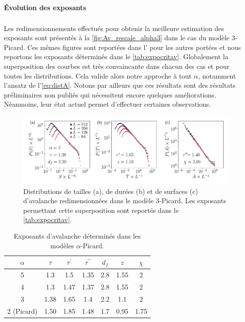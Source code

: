 \paragraph{\'Evolution des exposants}

\subparagraph{}Les redimensionnements effectués pour obtenir la meilleure estimation des exposants sont présentés à la \autoref{fig:Av_rescale_alpha3} dans le cas du modèle 3-Picard. Ces mêmes figures sont reportées dans l' pour les autres portées et nous reportons les exposants déterminés dans le \autoref{tab:expocritav}. Globalement la superposition des courbes est très convaincante dans chacun des cas et pour toutes les distributions. Cela valide alors notre approche à tout $\alpha$, notamment l'ansatz de l'\autoref{eq:distA}. Notons par ailleurs que ces résultats sont des résultats préliminaires non publiés qui nécessitent encore quelques améliorations. Néanmoins, leur état actuel permet d'effectuer certaines observations.

\begin{figure}[h]
	\centering
	\includegraphics[width=\textwidth]{Chapitre4/Figures/Avalanches/Rescale_Av_alpha3.pdf}
	\caption{Distributions de tailles (a), de durées (b) et de surfaces (c) d'avalanche redimensionnées dans le modèle 3-Picard. Les exposants permettant cette superposition sont reportés dans le \autoref{tab:expocritav}.}
	\label{fig:Av_rescale_alpha3}
\end{figure}

\begin{table}[h]
\centering
\begin{tabular}{ccccccc}
\hline \hline $\alpha$ & $\tau$ & \multicolumn{1}{c}{$\tau^\prime$} & $\tau^{\prime\prime}$ & $d_f$ & $z$ & $\chi$ \\
\hline 5 & 1.3 & 1.5 & 1.35 & 2.8 & 1.55 & 2 \\
4 & 1.3 & 1.47 & 1.37 & 2.8 & 1.55 & 2 \\
3 & 1.38 & 1.65 & 1.4 & 2.2 & 1.1 & 2 \\
2 (Picard) & 1.50 & 1.85 & 1.48 & 1.7 & 0.95 & 1.75 \\
\hline \hline
\end{tabular}
\caption{Exposants d'avalanche déterminés dans les modèles $\alpha$-Picard.}
\label{tab:expocritav}
\end{table}

